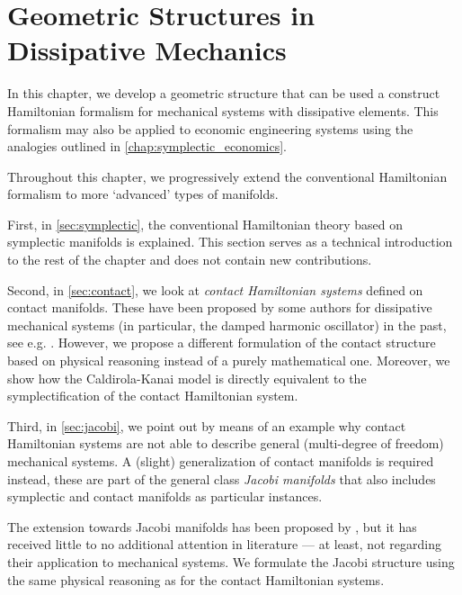 \chapter{Geometric Structures in Dissipative Mechanics}
\label{chap:geometric_structures}

In this chapter, we develop a geometric structure that can be used a construct Hamiltonian formalism for mechanical systems with dissipative elements. This formalism may also be applied to economic engineering systems using the analogies outlined in \cref{chap:symplectic_economics}.

Throughout this chapter, we progressively extend the conventional Hamiltonian formalism to more `advanced' types of manifolds.

First, in \cref{sec:symplectic}, the conventional Hamiltonian theory based on symplectic manifolds is explained. This section serves as a technical introduction to the rest of the chapter and does not contain new contributions.

Second, in \cref{sec:contact}, we look at \emph{contact Hamiltonian systems} defined on contact manifolds. These have been proposed by some authors for dissipative mechanical systems (in particular, the damped harmonic oscillator) in the past, see e.g. \citet{Bravetti2015}. However, we propose a different formulation of the contact structure based on physical reasoning instead of a purely mathematical one. Moreover, we show how the Caldirola-Kanai model is directly equivalent to the symplectification of the contact Hamiltonian system.

Third, in \cref{sec:jacobi}, we point out by means of an example why contact Hamiltonian systems are not able to describe general (multi-degree of freedom) mechanical systems. A (slight) generalization of contact manifolds is required instead, these are part of the general class \emph{Jacobi manifolds} that also includes symplectic and contact manifolds as particular instances. 

The extension towards Jacobi manifolds has been proposed by \citet{ciaglia2018}, but it has received little to no additional attention in literature --- at least, not regarding their application to mechanical systems. We formulate the Jacobi structure using the same physical reasoning as for the contact Hamiltonian systems.







